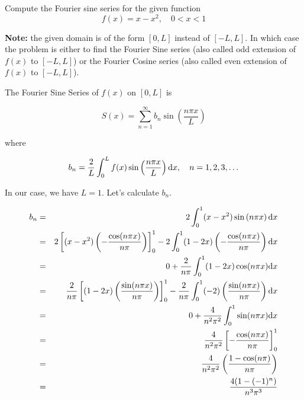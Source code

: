 \documentclass[11pt]{article}
\begin{document}
\begin{problem}
Compute the Fourier sine series for the given function
\begin{equation*}
f(x) = x-x^2, \quad 0<x<1
\end{equation*}
\end{problem}

\begin{solution}
\textbf{Note:} the given domain is of the form $[0, L]$ instead of $[-L, L]$. In which case the problem is either to find the Fourier Sine series (also called odd extension of $f(x)$ to $[-L, L]$) or the Fourier Cosine series (also called even extension of $f(x)$ to $[-L, L]$).

The Fourier Sine Series of $f(x)$ on $[0,L]$ is

\begin{equation*}
S(x) = \sum_{n=1}^{\infty} b_{n} \sin \left(\dfrac{n\pi x}{L}\right)
\end{equation*}

where 

\begin{equation*}
b_{n} = \dfrac{2}{L} \int_{0}^{L} f(x) \sin \left( \dfrac{n \pi x}{L} \right) {\rm d} x, \quad n=1,2,3,\ldots
\end{equation*}

In our case, we have $L=1$. Let's calculate $b_{n}$.

\begin{eqnarray*}
b_{n} & = & 2 \int_{0}^{1} (x-x^2) \sin \left( n \pi x\right) {\rm d} x \\
 & = & 2 \left[(x-x^2)\left(- \dfrac{\cos(n \pi x)}{n \pi} \right) \right]_{0}^{1} -2  \int_{0}^{1} (1-2x) \left(- \dfrac{\cos(n \pi x)}{n \pi} \right) {\rm d} x \\
  & = &0 + \dfrac{2}{n \pi}  \int_{0}^{1} (1-2x)  \cos(n \pi x) {\rm d} x \\
& = & \dfrac{2}{n \pi} \left[  (1-2x)\left( \dfrac{\sin(n \pi x)}{n \pi} \right) \right]_{0}^{1} - \dfrac{2}{n \pi} \int_{0}^{1} (-2)  \left( \dfrac{\sin(n \pi x)}{n \pi} \right) {\rm d} x \\
& = & 0  + \dfrac{4}{n^2 \pi^2} \int_{0}^{1}   \sin(n \pi x) {\rm d} x \\
& = &\dfrac{4}{n^2 \pi^2} \left[- \dfrac{\cos(n \pi x)}{n \pi} \right]_{0}^{1} \\
& = &\dfrac{4}{n^2 \pi^2} \left( \dfrac{1-\cos(n \pi)}{n \pi} \right) \\
& = &\dfrac{4(1-(-1)^n)}{n^3 \pi^3}  \\
\end{eqnarray*}


\end{solution}
\end{document}
